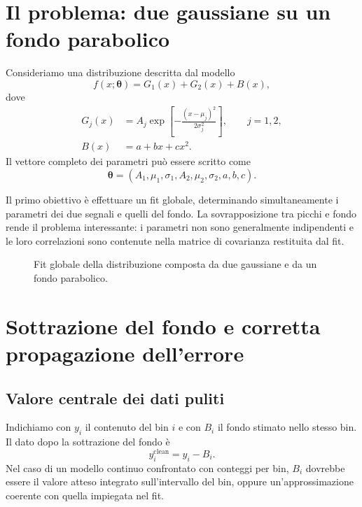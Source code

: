 \documentclass[11pt,a4paper]{book}
\begin{document}
\section{Il problema: due gaussiane su un fondo parabolico}
Consideriamo una distribuzione descritta dal modello
\begin{equation}
  f(x;\bm\theta)=G_1(x)+G_2(x)+B(x),
\end{equation}
dove
\begin{align}
  G_j(x) &= A_j\exp\!\left[-\frac{(x-\mu_j)^2}{2\sigma_j^2}\right], \qquad j=1,2,\\
  B(x) &= a+bx+cx^2.
\end{align}
Il vettore completo dei parametri può essere scritto come
\begin{equation}
 \bm\theta=(A_1,\mu_1,\sigma_1,A_2,\mu_2,\sigma_2,a,b,c).
\end{equation}

Il primo obiettivo è effettuare un fit globale, determinando simultaneamente i parametri dei due segnali e quelli del fondo. La sovrapposizione tra picchi e fondo rende il problema interessante: i parametri non sono generalmente indipendenti e le loro correlazioni sono contenute nella matrice di covarianza restituita dal fit.

\begin{figure}[htbp]
  \centering
  \caption{Fit globale della distribuzione composta da due gaussiane e da un fondo parabolico.}
  \label{fig:fitglobale}
\end{figure}

\section{Sottrazione del fondo e corretta propagazione dell'errore}
\subsection{Valore centrale dei dati puliti}
Indichiamo con $y_i$ il contenuto del bin $i$ e con $B_i$ il fondo stimato nello stesso bin. Il dato dopo la sottrazione del fondo è
\begin{equation}
  y_i^{\mathrm{clean}}=y_i-B_i.
\end{equation}
Nel caso di un modello continuo confrontato con conteggi per bin, $B_i$ dovrebbe essere il valore atteso integrato sull'intervallo del bin, oppure un'approssimazione coerente con quella impiegata nel fit.
\end{document}
